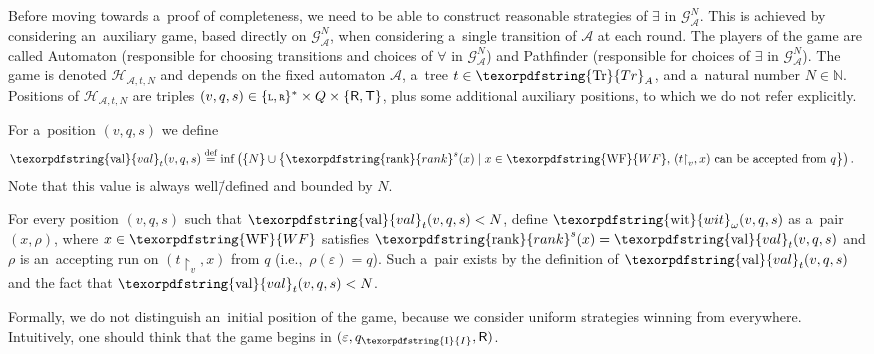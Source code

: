 \documentclass[11pt,a4paper]{amsart}
\theoremstyle{plain}
\theoremstyle{definition}
\theoremstyle{defC}
\theoremstyle{thmC}
\theoremstyle{plain}
\numberwithin{equation}{section}
\numberwithin{equation}{section}
\numberwithin{figure}{section}
\newcommand{\ident}[1]{\ensuremath{\texorpdfstring{\mathrm{\mathnm{#1}}}{#1}}\xspace}
\newcommand{\domain}[1]{\ensuremath{\mathbb{#1}}\xspace}
\newcommand{\N}{\domain{N}}
\newcommand{\eqdef}{\stackrel{\text{def}}=}
\newcommand{\mathcalsym}[1]{\ensuremath{\mathcal{#1}}\xspace}
\newcommand{\CA}{\mathcalsym{A}}
\newcommand{\CG}{\mathcalsym{G}}
\newcommand{\CH}{\mathcalsym{H}}
\newcommand{\dL}{\mathtt{{\scriptstyle L}}}
\newcommand{\dR}{\mathtt{{\scriptstyle R}}}
\newcommand{\mathnm}[1]{#1}
\newcommand{\restr}{{\upharpoonright}}
\newcommand{\init}{\ident{I}}
\newcommand{\trees}{\ident{Tr}}
\newcommand{\val}{\ident{val}}
\newcommand{\WF}{\ident{WF}}
\newcommand{\sT}{\mathsf{T}}
\newcommand{\sR}{\mathsf{R}}
\newcommand{\rankX}[1]{\ident{rank}^{#1}}
\renewcommand\epsilon\varepsilon
\newcommand{\eve}{\ensuremath{\exists}\xspace}
\newcommand{\adam}{\ensuremath{\forall}\xspace}
\DeclarePairedDelimiter{\set}{\{}{\}}
\newcommand{\wit}{\ident{wit}_\omega}
\begin{document}
Before moving towards a~proof of completeness, we need to be able to construct reasonable strategies of \eve in $\CG^N_\CA$.
This is achieved by considering an~auxiliary game, based directly on $\CG^N_\CA$, when considering a~single transition of $\CA$ at each round.
The players of the game are called Automaton (responsible for choosing transitions and choices of \adam in $\CG^N_\CA$) and Pathfinder (responsible for choices of \eve in $\CG^N_\CA$).
The game is denoted $\CH_{\CA,t,N}$ and depends on the fixed automaton $\CA$, a~tree $t\in\trees_A$, and a~natural number $N\in\N$.
Positions of $\CH_{\CA,t,N}$ are triples $(v,q,s)\in\set{\dL,\dR}^\ast\times Q\times\{\sR,\sT\}$,
plus some additional auxiliary positions, to which we do not refer explicitly.

For a~position $(v,q,s)$ we define
\begin{align*}
\val_t(v,q,s)&\eqdef\inf \left(\{N\}\cup\big\{\rankX{s}(x)\mid \text{$x\in\WF$, $(t\restr_v, x)$ can be accepted from $q$}\big\}\right).
\end{align*}
Note that this value is always well\=/defined and bounded by $N$.

For every position $(v,q,s)$ such that $\val_t(v,q,s)<N$, define $\wit(v,q,s)$ as a~pair $(x,\rho)$, where $x\in \WF$ satisfies $\rankX{s}(x) = \val_t(v,q,s)$ and $\rho$ is an~accepting run on $(t\restr_v, x)$ from $q$ (i.e.,~$\rho(\epsilon)=q$).
Such a~pair exists by the definition of $\val_t(v,q,s)$ and the fact that $\val_t(v,q,s)<N$.

Formally, we do not distinguish an~initial position of the game, because we consider uniform strategies winning from everywhere.
Intuitively, one should think that the game begins in $(\epsilon, q_\init, \sR)$.
\end{document}
